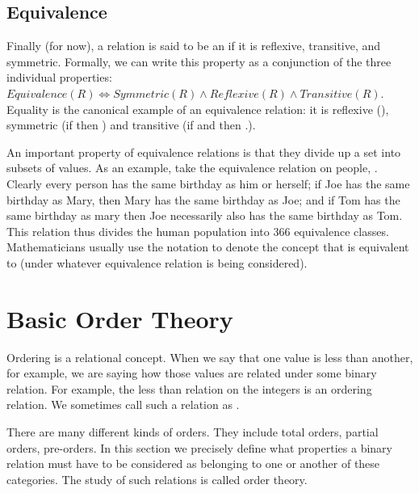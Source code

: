 \documentclass[letterpaper,10pt,english]{sphinxmanual}
\begin{document}
\subsection{Equivalence}
\label{\detokenize{08-relations:equivalence}}
Finally (for now), a relation is said to be an 
if it is reflexive, transitive, and symmetric. Formally, we can write
this property as a conjunction of the three individual properties:
\(Equivalence(R) \iff Symmetric(R) \land Reflexive(R) \land
Transitive(R)\). Equality is the canonical example of an equivalence
relation: it is reflexive (), symmetric (if  then ) and transitive (if  and  then .).

An important property of equivalence relations is that they divide up
a set into subsets of  values. As an example, take the
equivalence relation on people, . Clearly every
person has the same birthday as him or herself; if Joe has the same
birthday as Mary, then Mary has the same birthday as Joe; and if Tom
has the same birthday as mary then Joe necessarily also has the same
birthday as Tom. This relation thus divides the human population into
366 equivalence classes. Mathematicians usually use the notation  to denote the concept that  is equivalent to  (under whatever
equivalence relation is being considered).


\section{Basic Order Theory}
\label{\detokenize{08-relations:basic-order-theory}}
Ordering is a relational concept. When we say that one value is less
than another, for example, we are saying how those values are related
under some binary relation. For example, the less than relation on the
integers is an ordering relation. We sometimes call such a relation as
.

There are many different kinds of orders. They include total orders,
partial orders, pre-orders. In this section we precisely define what
properties a binary relation must have to be considered as belonging
to one or another of these categories. The study of such relations is
called order theory.
\end{document}
